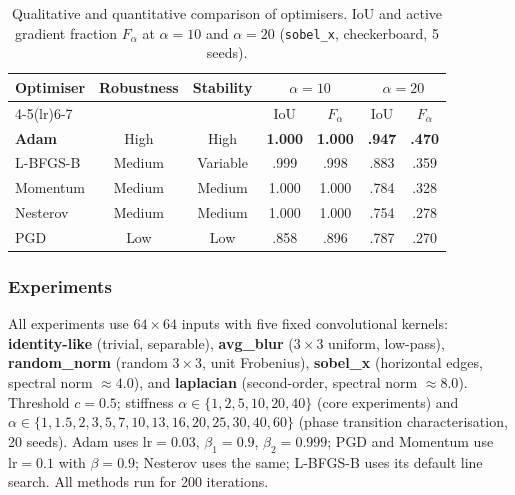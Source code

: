 \begin{table}[H]
\centering
\caption{Qualitative and quantitative comparison of optimisers. IoU and active
gradient fraction $F_\alpha$ at $\alpha=10$ and $\alpha=20$
(\texttt{sobel\_x}, checkerboard, 5 seeds).}
\label{tab:optimizer_summary}
\begin{tabular}{lcccccc}
\toprule
\multirow{2}{*}{Optimiser} & \multirow{2}{*}{Robustness} &
\multirow{2}{*}{Stability} &
\multicolumn{2}{c}{$\alpha=10$} &
\multicolumn{2}{c}{$\alpha=20$}\\
\cmidrule(lr){4-5}\cmidrule(lr){6-7}
 & & & IoU & $F_\alpha$ & IoU & $F_\alpha$\\
\midrule
\textbf{Adam} & High   & High     & \textbf{1.000} & \textbf{1.000} & \textbf{.947} & \textbf{.470}\\
L-BFGS-B      & Medium & Variable & .999 & .998 & .883 & .359\\
Momentum      & Medium & Medium   & 1.000 & 1.000 & .784 & .328\\
Nesterov      & Medium & Medium   & 1.000 & 1.000 & .754 & .278\\
PGD           & Low    & Low      & .858 & .896 & .787 & .270\\
\bottomrule
\end{tabular}
\end{table}

\subsubsection{Experiments}

All experiments use $64{\times}64$ inputs with five fixed convolutional
kernels: \textbf{identity-like} (trivial, separable), \textbf{avg\_blur}
($3{\times}3$ uniform, low-pass), \textbf{random\_norm} (random $3{\times}3$,
unit Frobenius), \textbf{sobel\_x} (horizontal edges, spectral norm
$\approx4.0$), and \textbf{laplacian} (second-order, spectral norm
$\approx8.0$). Threshold $c=0.5$; stiffness $\alpha\in\{1,2,5,10,20,40\}$
(core experiments) and $\alpha\in\{1,1.5,2,3,5,7,10,13,16,20,25,30,40,60\}$
(phase transition characterisation, 20 seeds). Adam uses $\mathrm{lr}=0.03$,
$\beta_1=0.9$, $\beta_2=0.999$; PGD and Momentum use $\mathrm{lr}=0.1$ with
$\beta=0.9$; Nesterov uses the same; L-BFGS-B uses its default line search.
All methods run for 200 iterations.

